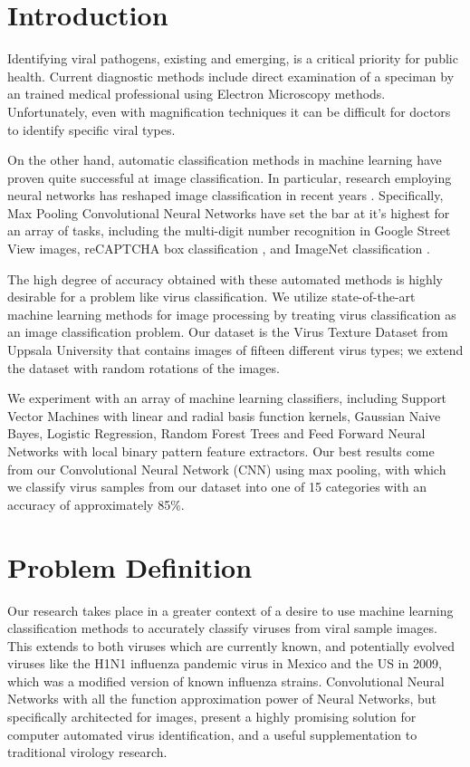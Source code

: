 \begin{multicols}{2}
\section{Introduction}
Identifying viral pathogens, existing and emerging, is a critical priority for public health. Current diagnostic methods include direct examination of a speciman by an trained medical professional using Electron Microscopy methods. Unfortunately, even with magnification techniques it can be difficult for doctors to identify specific viral types. 

On the other hand, automatic classification methods in machine learning have proven quite successful at image classification. In particular, research employing neural networks has reshaped image classification in recent years \citet{Juergen_2015}. Specifically, Max Pooling Convolutional Neural Networks have set the bar at it's highest for an array of tasks, including the multi-digit number recognition in Google Street View images, reCAPTCHA box classification \citet{DBLP:journals/corr/GoodfellowBIAS13}, and ImageNet classification \citet{NIPS2012_4824}. 

The high degree of accuracy obtained with these automated methods is highly desirable for a problem like virus classification. We utilize state-of-the-art machine learning methods for image processing by treating virus classification as an image classification problem. Our dataset is the Virus Texture Dataset from Uppsala University that contains images of fifteen different virus types; we extend the dataset with random rotations of the images. 

We experiment with an array of machine learning classifiers, including Support Vector Machines with linear and radial basis function kernels, Gaussian Naive Bayes, Logistic Regression, Random Forest Trees and Feed Forward Neural Networks with local binary pattern feature extractors. Our best results come from our Convolutional Neural Network (CNN) using max pooling, with which we classify virus samples from our dataset into one of 15 categories with an accuracy of approximately 85\%.

\section{Problem Definition}

Our research takes place in a greater context of a desire to use machine learning classification methods to accurately classify viruses from viral sample images. This extends to both viruses which are currently known, and potentially evolved viruses like the H1N1 influenza pandemic virus in Mexico and the US in 2009, which was a modified version of known influenza strains. Convolutional Neural Networks with all the function approximation power of Neural Networks, but specifically architected for images, present a highly promising solution for computer automated virus identification, and a useful supplementation to traditional virology research. 


\end{multicols}
